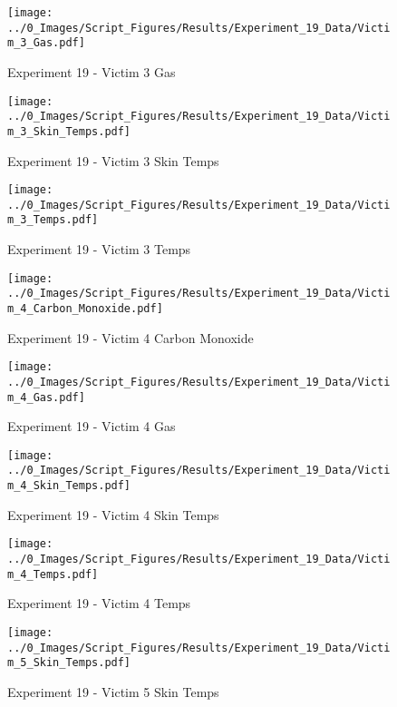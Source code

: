 	\clearpage

	\begin{figure}[H]
		\centering
		\texttt{[image: ../0\_Images/Script\_Figures/Results/Experiment\_19\_Data/Victim\_3\_Gas.pdf]}
		\caption[]{Experiment 19 - Victim 3 Gas}
	\end{figure}
 

	\begin{figure}[H]
		\centering
		\texttt{[image: ../0\_Images/Script\_Figures/Results/Experiment\_19\_Data/Victim\_3\_Skin\_Temps.pdf]}
		\caption[]{Experiment 19 - Victim 3 Skin Temps}
	\end{figure}
 
	\clearpage

	\begin{figure}[H]
		\centering
		\texttt{[image: ../0\_Images/Script\_Figures/Results/Experiment\_19\_Data/Victim\_3\_Temps.pdf]}
		\caption[]{Experiment 19 - Victim 3 Temps}
	\end{figure}
 

	\begin{figure}[H]
		\centering
		\texttt{[image: ../0\_Images/Script\_Figures/Results/Experiment\_19\_Data/Victim\_4\_Carbon\_Monoxide.pdf]}
		\caption[]{Experiment 19 - Victim 4 Carbon Monoxide}
	\end{figure}
 
	\clearpage

	\begin{figure}[H]
		\centering
		\texttt{[image: ../0\_Images/Script\_Figures/Results/Experiment\_19\_Data/Victim\_4\_Gas.pdf]}
		\caption[]{Experiment 19 - Victim 4 Gas}
	\end{figure}
 

	\begin{figure}[H]
		\centering
		\texttt{[image: ../0\_Images/Script\_Figures/Results/Experiment\_19\_Data/Victim\_4\_Skin\_Temps.pdf]}
		\caption[]{Experiment 19 - Victim 4 Skin Temps}
	\end{figure}
 
	\clearpage

	\begin{figure}[H]
		\centering
		\texttt{[image: ../0\_Images/Script\_Figures/Results/Experiment\_19\_Data/Victim\_4\_Temps.pdf]}
		\caption[]{Experiment 19 - Victim 4 Temps}
	\end{figure}
 

	\begin{figure}[H]
		\centering
		\texttt{[image: ../0\_Images/Script\_Figures/Results/Experiment\_19\_Data/Victim\_5\_Skin\_Temps.pdf]}
		\caption[]{Experiment 19 - Victim 5 Skin Temps}
	\end{figure}
 
